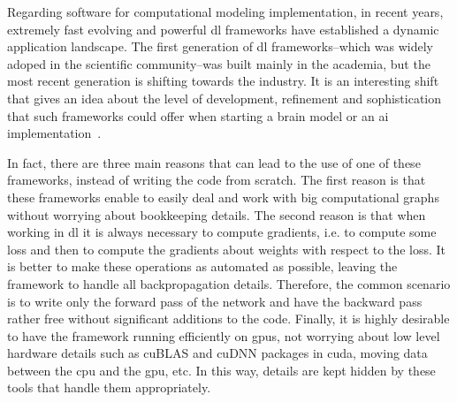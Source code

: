 \documentclass[10pt,journal,compsoc]{IEEEtran}
\begin{document}

Regarding software for computational modeling implementation, in recent years, extremely fast evolving and powerful \gls{dl} frameworks have established a dynamic application landscape. The first generation of \gls{dl} frameworks--which was widely adoped in the scientific community--was built mainly in the academia, but the most recent generation is shifting towards the industry. It is an interesting shift  that gives an idea about the level of development, refinement and sophistication that such frameworks could offer when starting a brain model or an \gls{ai} implementation~\cite{Bahrampour2015ComparativeSO,7979887}. 

In fact, there are three main reasons that can lead to the use of one of these frameworks, instead of writing the code from scratch. The first reason is that these frameworks enable to easily deal and work with big computational graphs without worrying about bookkeeping details. The second reason is that when working in \gls{dl} it is always necessary to compute gradients, i.e. to compute some loss and then to compute the gradients about weights with respect to the loss. It is better to make these operations as automated as possible, leaving the framework to handle all backpropagation details. Therefore, the common scenario is to write only the forward pass of the network and have the backward pass rather free without significant additions to the code. Finally, it is highly desirable to have the framework running efficiently on \glspl{gpu}, not worrying about low level hardware details such as cuBLAS and cuDNN packages in \gls{cuda}, moving data between the \gls{cpu} and the \gls{gpu}, etc. In this way, details are kept hidden by these tools that handle them appropriately.
\end{document}
